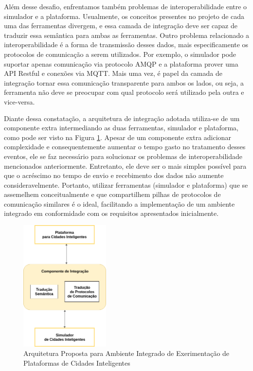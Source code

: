 Além desse desafio, enfrentamos também problemas de interoperabilidade entre o simulador e a plataforma.
Usualmente, os conceitos presentes no projeto de cada uma das ferramentas divergem, e essa camada de integração deve ser capaz de traduzir essa semântica para ambas as ferramentas.
Outro problema relacionado a interoperabilidade é a forma de transmissão desses dados, mais especificamente os protocolos de comunicação a serem utilizados.
Por exemplo, o simulador pode suportar apenas comunicação via protocolo AMQP e a plataforma prover uma API Restful e conexões via MQTT.
Mais uma vez, é papel da camada de integração tornar essa comunicação transparente para ambos os lados, ou seja, a ferramenta não deve se preocupar com qual protocolo será utilizado pela outra e vice-versa.

Diante dessa constatação, a arquitetura de integração adotada utiliza-se de um componente extra intermediando as duas ferramentas, simulador e plataforma, como pode ser visto na
Figura \ref{fig:general_architecture}.
Apesar de um componente extra adicionar complexidade e consequentemente aumentar o tempo gasto no tratamento desses eventos, ele se faz necessário para solucionar os problemas
de interoperabilidade mencionados anteriormente.
Entretanto, ele deve ser o mais simples possível para que o acréscimo no tempo de envio e recebimento dos dados não aumente consideravelmente.
Portanto, utilizar ferramentas (simulador e plataforma) que se assemelhem conceitualmente e que compartilhem pilhas de protocolos de comunicação similares é o ideal,
facilitando a implementação de um ambiente integrado em conformidade com os requisitos apresentados inicialmente.

\begin{figure}[ht]
	\centering
	\includegraphics[width=0.4\textwidth]{figuras/integration-general-architecture.png}
	\caption{Arquitetura Proposta para Ambiente Integrado de Exerimentação de Plataformas de Cidades Inteligentes}
	\label{fig:general_architecture}
\end{figure}



